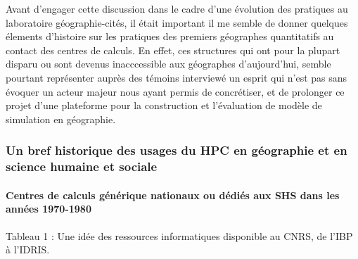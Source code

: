 Avant d'engager cette discussion dans le cadre d'une évolution des pratiques au laboratoire géographie-cités, il était important il me semble de donner quelques élements d'histoire sur les pratiques des premiers géographes quantitatifs au contact des centres de calculs. En effet, ces structures qui ont pour la plupart disparu ou sont devenus inacccessible aux géographes d'aujourd'hui, semble pourtant représenter auprès des témoins interviewé un esprit qui n'est pas sans évoquer un acteur majeur nous ayant permis de concrétiser, et de prolonger ce projet d'une plateforme pour la construction et l'évaluation de modèle de simulation en géographie.

\subsubsection{Un bref historique des usages du HPC en géographie et en science humaine et sociale}


\paragraph{Centres de calculs générique nationaux ou dédiés aux SHS dans les années 1970-1980}


Tableau 1 : Une idée des ressources informatiques disponible au CNRS, de l'IBP à l'IDRIS.

